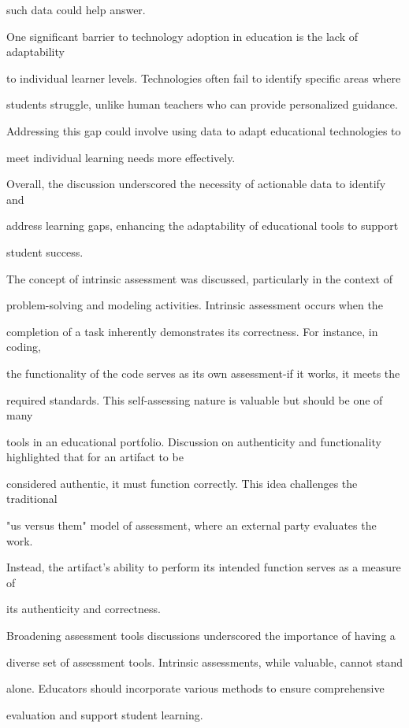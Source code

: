 \documentclass[11pt]{article}
\begin{document}
such data could help answer.

One significant barrier to technology adoption in education is the lack of adaptability

to individual learner levels. Technologies often fail to identify specific areas where

students struggle, unlike human teachers who can provide personalized guidance.

Addressing this gap could involve using data to adapt educational technologies to

meet individual learning needs more effectively.

Overall, the discussion underscored the necessity of actionable data to identify and

address learning gaps, enhancing the adaptability of educational tools to support

student success.

The concept of intrinsic assessment was discussed, particularly in the context of

problem-solving and modeling activities. Intrinsic assessment occurs when the

completion of a task inherently demonstrates its correctness. For instance, in coding,

the functionality of the code serves as its own assessment-if it works, it meets the

required standards. This self-assessing nature is valuable but should be one of many

tools in an educational portfolio. Discussion on authenticity and functionality highlighted that for an artifact to be

considered authentic, it must function correctly. This idea challenges the traditional

"us versus them" model of assessment, where an external party evaluates the work.

Instead, the artifact's ability to perform its intended function serves as a measure of

its authenticity and correctness.

Broadening assessment tools discussions underscored the importance of having a

diverse set of assessment tools. Intrinsic assessments, while valuable, cannot stand

alone. Educators should incorporate various methods to ensure comprehensive

evaluation and support student learning.
\end{document}

